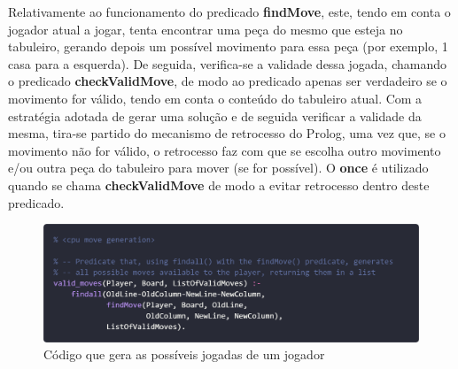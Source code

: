 \documentclass[a4paper]{article}
\begin{document}
\bigskip
Relativamente ao funcionamento do predicado \textbf{findMove}, este, tendo em conta o jogador atual a jogar, tenta encontrar uma peça do mesmo que esteja no tabuleiro, gerando depois um possível movimento para essa peça (por exemplo, 1 casa para a esquerda). De seguida, verifica-se a validade dessa jogada, chamando o predicado \textbf{checkValidMove}, de modo ao predicado apenas ser verdadeiro se o movimento for válido, tendo em conta o conteúdo do tabuleiro atual. Com a estratégia adotada de gerar uma solução e de seguida verificar a validade da mesma, tira-se partido do mecanismo de retrocesso do Prolog, uma vez que, se o movimento não for válido, o retrocesso faz com que se escolha outro movimento e/ou outra peça do tabuleiro para mover (se for possível). O \textbf{once} é utilizado quando se chama \textbf{checkValidMove} de modo a evitar retrocesso dentro deste predicado.

\bigskip
\begin{figure}[hbp!]
    \centering
    \includegraphics[width=\linewidth]{prints/move-generation-1.png}
    \caption{Código que gera as possíveis jogadas de um jogador}
    \label{fig}
\end{figure}
\end{document}
